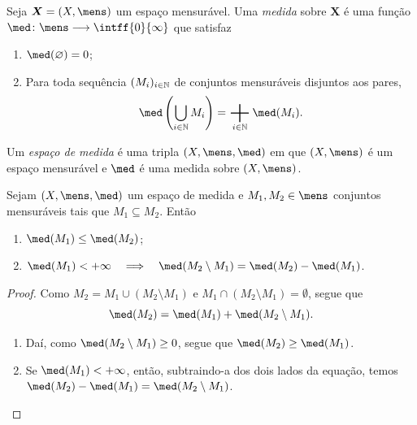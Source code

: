 \begin{defi}
Seja $\bm X=(X,\mens)$ um espaço mensurável. Uma \emph{medida} sobre $\bm X$ é uma função $\med\colon \mens \to \intff{0}{\infty}$ que satisfaz
	\begin{enumerate}
	\item $\med(\emptyset)=0$;
	\item Para toda sequência $(M_i)_{i \in \mathbb{N}}$ de conjuntos mensuráveis disjuntos aos pares,
	\begin{equation*}
	\med\left(\bigcup_{i \in \N} M_i\right)=\sum_{i \in \N} \med(M_i).
	\end{equation*}
	\end{enumerate}
\end{defi}

\begin{defi}
	Um \emph{espaço de medida} é uma tripla $(X,\mens,\med)$ em que $(X,\mens)$ é um espaço mensurável e $\med$ é uma medida sobre $(X,\mens)$.
\end{defi}

\begin{prop}
Sejam $(X, \mens,\med)$ um espaço de medida e $M_1,M_2 \in \mens$ conjuntos mensuráveis tais que $M_1 \subseteq M_2$. Então
	\begin{enumerate}
	\item $\med(M_1) \leq \med(M_2)$;
	\item $\med(M_1) < + \infty \entao \med(M_2 \setminus M_1) = \med(M_2) - \med(M_1)$.
	\end{enumerate}
\end{prop}
\begin{proof}
	Como $M_2 = M_1 \cup (M_2 \setminus M_1)$ e $M_1 \cap (M_2 \setminus M_1) = \emptyset$, segue que
	\begin{equation*}
	\med(M_2)=\med(M_1)+\med(M_2 \setminus M_1).
	\end{equation*}
	\begin{enumerate}
	\item Daí, como $\med(M_2 \setminus M_1) \geq 0$, segue que $\med(M_2) \geq \med(M_1)$.
	\item Se $\med(M_1) < + \infty$, então, subtraindo-a dos dois lados da equação, temos $\med(M_2)-\med(M_1)=\med(M_2 \setminus M_1)$.
	\end{enumerate}
\end{proof}

